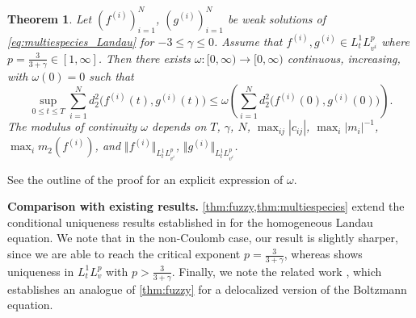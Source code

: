 \documentclass[10pt,oneside]{amsart}
\numberwithin{equation}{section}
\numberwithin{definition}{section}
\newtheorem{theorem}{Theorem}
\numberwithin{theorem}{section}
\numberwithin{lemma}{section}
\begin{document}
\begin{theorem}\label{thm:multiespecies}
  Let $(f^{(i)})_{i=1}^{N}$, $(g^{(i)})_{i=1}^{N}$ be weak solutions of \eqref{eq:multiespecies_Landau} for $-3\leq \gamma\leq 0$. Assume that $f^{(i)},g^{(i)}\in L^1_tL^p_{v^i}$ where $p=\frac{3}{3+\gamma}\in [1,\infty]$. Then there exists $\omega:[0,\infty)\longrightarrow[0,\infty)$ continuous, increasing, with $\omega(0)=0$ such that
  \begin{equation*}
    \sup_{0\leq t\leq T} \sum_{i=1}^{N}d_{2}^{2}\big(f^{(i)}(t),g^{(i)}(t)\big) \leq
    \omega\left(
      \sum_{i=1}^{N}d_{2}^{2}\big(f^{(i)}(0),g^{(i)}(0)\big)
    \right).
  \end{equation*}
  The modulus of continuity $\omega$ depends on $T$, $\gamma$, $N$, $\max_{ij}|c_{ij}|$, $\max_{i}|m_{i}|^{-1}$, $\max_i m_2(f^{(i)})$, and $\Vert f^{(i)}\Vert_{L^1_tL^p_{v^i}}$, $\Vert g^{(i)}\Vert_{L^1_tL^p_{v^i}}$. 
\end{theorem}
% 
See the outline of the proof for an explicit expression of $\omega$.

\textbf{Comparison with existing results.} \cref{thm:fuzzy,thm:multiespecies} extend the conditional uniqueness results established in \cite{fournier2009well_posedness_soft_potentials,fournier2010uniqueness_Coulomb} for the homogeneous Landau equation. We note that in the non-Coulomb case, our result is slightly sharper, since we are able to reach the critical exponent ${p=\frac{3}{3+\gamma}}$, whereas \cite{fournier2009well_posedness_soft_potentials} shows uniqueness in $L^1_tL^p_v$ with $p>\frac{3}{3+\gamma}$. Finally, we note the related work \cite{FriesenMartinSundar2022BoltEnskog}, which establishes an analogue of  \cref{thm:fuzzy} for a delocalized version of the Boltzmann equation.
\end{document}
